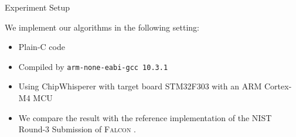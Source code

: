 \begin{frame}{Experiment Setup}

We implement our algorithms in the following setting:
\pause

\begin{itemize}
\item Plain-C code
\pause
\item Compiled by {\tt arm-none-eabi-gcc 10.3.1}
\pause
\item Using ChipWhisperer with target board STM32F303 with an ARM Cortex-M4 MCU
\pause
\item We compare the result with the reference implementation of the NIST Round-3 Submission of \textsc{Falcon} \cite{NISTPQC-R3:FALCON20}.
\end{itemize}

\end{frame}




